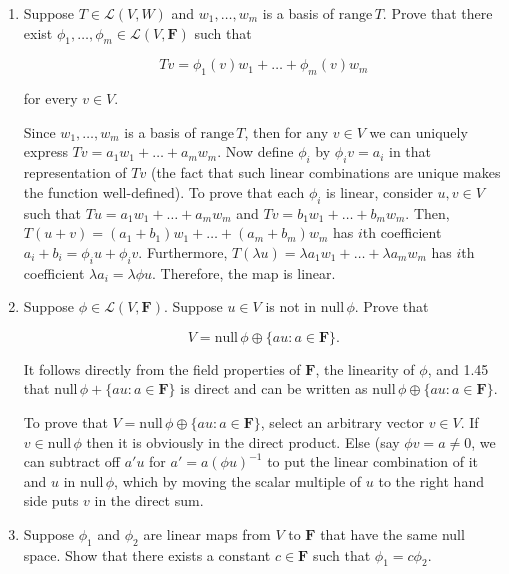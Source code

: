 \documentclass{book}
\begin{document}
\begin{enumerate}
\item Suppose \(T \in \mathcal{L}(V,W)\) and \(w_1,\dots,w_m\) is a basis of \(\textrm{range} \, T\).  Prove that there exist \(\phi_1,\dots,\phi_m \in \mathcal{L}(V,\textbf{F})\) such that

\begin{equation*}
    Tv=\phi_1(v)w_1+\dots+\phi_m(v)w_m
\end{equation*}

for every \(v \in V\).

Since \(w_1,\dots,w_m\) is a basis of \(\text{range} \, T\), then for any \(v \in V\) we can uniquely express \(Tv = a_1w_1+\dots+a_mw_m\).  Now define \(\phi_i\) by \(\phi_iv=a_i\) in that representation of \(Tv\) (the fact that such linear combinations are unique makes the function well-defined).  To prove that each \(\phi_i\) is linear, consider \(u,v \in V\) such that \(Tu = a_1w_1+\dots+a_mw_m\) and \(Tv = b_1w_1+\dots+b_mw_m\).  Then, \(T(u+v) = (a_1+b_1)w_1+\dots+(a_m+b_m)w_m\) has \(i\)th coefficient \(a_i+b_i = \phi_i u + \phi_i v\).  Furthermore, \(T(\lambda u) = \lambda a_1w_1+\dots+\lambda a_mw_m\) has \(i\)th coefficient \(\lambda a_i = \lambda \phi u\).  Therefore, the map is linear.

\item Suppose \(\phi \in \mathcal{L}(V,\textbf{F})\).  Suppose \(u \in V\) is not in \(\textrm{null} \, \phi\).  Prove that

\begin{equation*}
    V=\text{null} \, \phi \oplus \{au:a \in \textbf{F}\}.
\end{equation*}

It follows directly from the field properties of \(\textbf{F}\), the linearity of \(\phi\), and 1.45 that \(\text{null} \, \phi + \{au:a \in \textbf{F}\}\) is direct and can be written as \(\text{null} \, \phi \oplus \{au:a \in \textbf{F}\}\).

To prove that \(V = \text{null} \, \phi \oplus \{au:a \in \textbf{F}\}\), select an arbitrary vector \(v \in V\).  If \(v \in \text{null} \, \phi\) then it is obviously in the direct product.  Else (say \(\phi v = a \neq 0\), we can subtract off \(a'u\) for \(a'=a(\phi u)^{-1}\) to put the linear combination of it and \(u\) in \(\text{null} \, \phi\), which by moving the scalar multiple of \(u\) to the right hand side puts \(v\) in the direct sum.

\item Suppose \(\phi_1\) and \(\phi_2\) are linear maps from \(V\) to \(\textbf{F}\) that have the same null space.  Show that there exists a constant \(c \in \textbf{F}\) such that \(\phi_1=c\phi_2\).


\end{enumerate}
\end{document}
